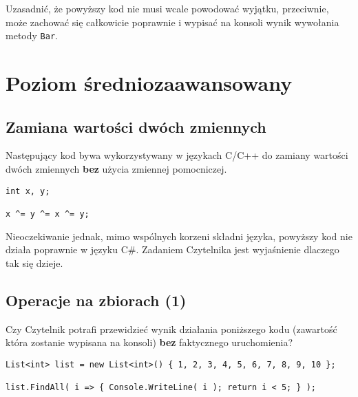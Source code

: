 Uzasadnić, że powyższy kod nie musi wcale powodować wyjątku, przeciwnie, może zachować się całkowicie poprawnie i wypisać na konsoli wynik wywołania metody {\tt Bar}.


\section{Poziom średniozaawansowany}

\subsection{Zamiana wartości dwóch zmiennych}

Następujący kod bywa wykorzystywany w językach C/C++ do zamiany wartości dwóch zmiennych {\bf bez} użycia zmiennej pomocniczej.

\begin{scriptsize}
\begin{verbatim}
int x, y;
 
x ^= y ^= x ^= y;
\end{verbatim}
\end{scriptsize}

Nieoczekiwanie jednak, mimo wspólnych korzeni składni języka, powyższy kod nie działa poprawnie w języku C\#. Zadaniem Czytelnika jest wyjaśnienie dlaczego tak się dzieje.

\subsection{Operacje na zbiorach (1)}

Czy Czytelnik potrafi przewidzieć wynik działania poniższego kodu (zawartość która zostanie wypisana na konsoli) {\bf bez} faktycznego uruchomienia?

\begin{scriptsize}
\begin{verbatim}
List<int> list = new List<int>() { 1, 2, 3, 4, 5, 6, 7, 8, 9, 10 };
 
list.FindAll( i => { Console.WriteLine( i ); return i < 5; } );
\end{verbatim}
\end{scriptsize}

